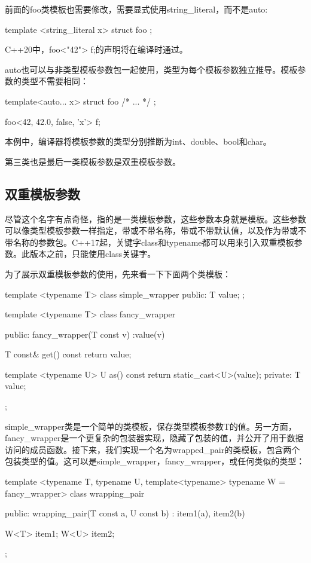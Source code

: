 前面的foo类模板也需要修改，需要显式使用string\_literal，而不是auto:

\begin{cpp}
template <string_literal x>
struct foo
{
};
\end{cpp}

C++20中，foo<"42"> f;的声明将在编译时通过。

auto也可以与非类型模板参数包一起使用，类型为每个模板参数独立推导。模板参数的类型不需要相同：

\begin{cpp}
template<auto... x>
struct foo
{ /* ... */ };

foo<42, 42.0, false, 'x'> f;
\end{cpp}

本例中，编译器将模板参数的类型分别推断为int、double、bool和char。

第三类也是最后一类模板参数是双重模板参数。

\subsection{双重模板参数}

尽管这个名字有点奇怪，指的是一类模板参数，这些参数本身就是模板。这些参数可以像类型模板参数一样指定，带或不带名称，带或不带默认值，以及作为带或不带名称的参数包。C++17起，关键字class和typename都可以用来引入双重模板参数。此版本之前，只能使用class关键字。

为了展示双重模板参数的使用，先来看一下下面两个类模板：

\begin{cpp}
template <typename T>
class simple_wrapper
{
public:
	T value;
};

template <typename T>
class fancy_wrapper
{
public:
	fancy_wrapper(T const v) :value(v)
	{
	}

	T const& get() const { return value; }
	
	template <typename U>
	U as() const
	{
		return static_cast<U>(value);
	}
private:
	T value;
};
\end{cpp}

simple\_wrapper类是一个简单的类模板，保存类型模板参数T的值。另一方面，fancy\_wrapper是一个更复杂的包装器实现，隐藏了包装的值，并公开了用于数据访问的成员函数。接下来，我们实现一个名为wrapped\_pair的类模板，包含两个包装类型的值。这可以是simple\_wrapper，fancy\_wrapper，或任何类似的类型：

\begin{cpp}
template <typename T, typename U,
		  template<typename> typename W = fancy_wrapper>
class wrapping_pair
{
public:
	wrapping_pair(T const a, U const b) :
		item1(a), item2(b)
	{
	}

	W<T> item1;
	W<U> item2;
};
\end{cpp}

